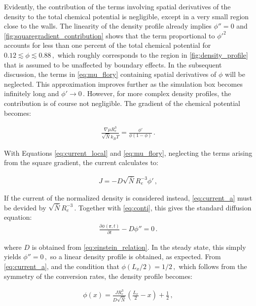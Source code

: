 \documentclass[bachelor,       %
               oneside,        %
               BCOR10mm,       %
               ngerman, english %
               ]{GAUBM}
\begin{document}
Evidently, the contribution of the terms involving spatial derivatives of the density to the total chemical potential is negligible, except in a very small region close to the walls. The linearity of the density profile already implies $\phi''=0$ and \autoref{fig:squaregradient_contribution} shows that the term proportional to $\phi'^2$ accounts for less than one percent of the total chemical potential for $0.12\lesssim\phi\lesssim 0.88\,,$ which roughly corresponds to the region in \autoref{fig:density_profile} that is assumed to be unaffected by boundary effects. In the subsequent discussion, the terms in \autoref{eq:mu_flory} containing spatial derivatives of $\phi$ will be neglected. This approximation improves further as the simulation box becomes infinitely long and $\phi'\rightarrow 0\,.$ However, for more complex density profiles, the contribution is of course not negligible. The gradient of the chemical potential becomes:

\begin{align}
    \frac{\nabla\mu R_e^3}{\sqrt{\bar N}k_BT}=\frac{\phi'}{\phi(1-\phi)}\,.
    \label{eq:gradmu}
\end{align}

With Equations \eqref{eq:current_local} and \eqref{eq:mu_flory}, neglecting the terms arising from the square gradient, the current calculates to:


\begin{align}
  J=-D\sqrt{\bar N}R_e^{-3}\phi'\,,
  \label{eq:current_a}
\end{align}


If the current of the normalized density is considered instead, \autoref{eq:current_a} must be devided by $\sqrt{\bar N}R_e^{-3}\,.$ Together with \autoref{eq:conti}, this gives the standard diffusion equation:
\begin{align}
  \frac{\partial\phi(\mathbf r, t)}{\partial t}-D \phi''=0\,.
  \label{eq:diffusion}
\end{align}

where $D$ is obtained from \autoref{eq:einstein_relation}. In the steady state, this simply yields $\phi''=0\,,$ so a linear density profile is obtained, as expected. From \autoref{eq:current_a}, and the condition that $\phi(L_x/2)=1/2\,,$ which follows from the symmetry of the conversion rates, the density profile becomes:

\begin{align}
  \phi(x)=\frac{JR_e^3}{D\sqrt{\bar{N}}}\left(\frac{L_x}{2}-x\right) + \frac{1}{2}\,,
  \label{eq:density_profile_ana}
\end{align}
\end{document}
